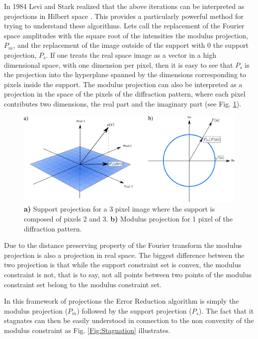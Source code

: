 In 1984 Levi and Stark realized that the above iterations can be
interpreted as projections in Hilbert space \cite{Levi1984Image}. This provides a
particularly powerful method for trying to understand these algorithms.
Lets call the replacement of the Fourier space amplitudes with the square root of
the intensities the modulus projection, $P_m$, and the replacement of the image
outside of the support with 0 the support projection, $P_s$. If one treats the
real space image as a vector in a high dimensional space, with one dimension per
pixel, then it is easy to see that $P_s$ is the projection into the hyperplane
spanned by the dimensions corresponding to pixels inside the support. The
modulus projection can also be interpreted as a projection in the space of the
pixels of the diffraction pattern, where each pixel contributes two dimensions,
the real part and the imaginary part (see Fig. \ref{Fig:Projections}). 

\begin{figure}[h]
  \centering
  \includegraphics[width=1 \columnwidth]{Image_Reconstruction/projections.png}
  \caption{{\bf a)} Support projection for a 3 pixel image where the support is
    composed of pixels 2 and 3. {\bf b)} Modulus projection for 1 pixel of the
    diffraction pattern.}
  \label{Fig:Projections}
\end{figure}

Due to the distance preserving property of the Fourier transform the modulus
projection is also a projection in real space. The biggest difference between
the two projection is that while the support constraint set is convex, the
modulus constraint is not, that is to say, not all points between two points of the modulus
constraint set belong to the modulus constraint set.

In this framework of projections the Error Reduction algorithm is simply the
modulus projection ($P_m$) followed by the support projection ($P_s$). The fact that it stagnates can then be easily understood in
connection to the non convexity of the modulus constraint as
Fig. \ref{Fig:Stagnation} illustrates.

